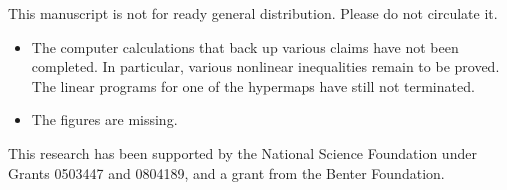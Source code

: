 \noindent



\bigskip




\begin{note}%
This manuscript is not for ready general distribution.  Please do not circulate it.
\begin{itemize}
\item The computer calculations that back up various claims have not
  been completed.  In particular, various nonlinear inequalities
  remain to be proved.  The linear programs for one of the hypermaps
  have still not terminated.
\item The figures are missing.
\end{itemize}
\end{note}

\bigskip\noindent %
This research has been supported by the National Science Foundation
under Grants 0503447 and 0804189, and a grant from the Benter
Foundation.

\bigskip\noindent\svninfo 

\newpage

